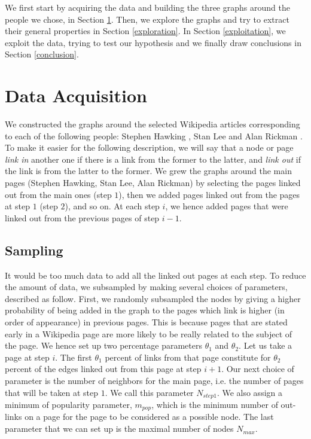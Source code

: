 \documentclass[conference]{IEEEtran}
\begin{document}
\begin{center}

\end{center}

We first start by acquiring the data and building the three graphs around the people we chose, in Section \ref{acquisition}. Then, we explore the graphs and try to extract their general properties in Section \ref{exploration}. In Section \ref{exploitation}, we exploit the data, trying to test our hypothesis and we finally draw conclusions in Section \ref{conclusion}. 

\section{Data Acquisition} \label{acquisition}

We constructed the graphs around the selected Wikipedia articles corresponding to each of the following people: Stephen Hawking \cite{stephenhawking}, Stan Lee \cite{stanlee} and Alan Rickman \cite{alanrickman}. To make it easier for the following description, we will say that a node or page \textit{link in} another one if there is a link from the former to the latter, and \textit{link out} if the link is from the latter to the former. We grew the graphs around the main pages (Stephen Hawking, Stan Lee, Alan Rickman) by selecting the pages linked out from the main ones (step $1$), then we added pages linked out from the pages at step $1$ (step $2$), and so on. At each step $i$, we hence added pages that were linked out from the previous pages of step $i-1$. 

\subsection{Sampling}
It would be too much data to add all the linked out pages at each step.  To reduce the amount of data, we  subsampled by making several choices of parameters, described as follow. First, we randomly subsampled the nodes by giving a higher probability of being added in the graph to the pages which link is higher (in order of appearance) in previous pages. This is because pages that are stated early in a Wikipedia page are more likely to be really related to the subject of the page. We hence set up two percentage parameters $\theta_1$ and $\theta_2$. Let us take a page at step $i$. The first $\theta_1$ percent of links from that page constitute for $\theta_2$ percent of the edges linked out from this page at step $i+1$. Our next choice of parameter is the number of neighbors for the main page, i.e. the number of pages that will be taken at step $1$. We call this parameter $N_{step1}$. We also assign a minimum of popularity parameter, $m_{pop}$, which is the minimum number of out-links on a page for the page to be considered as a possible node. The last parameter that we can set up is the maximal number of nodes $N_{max}$. 
\end{document}
